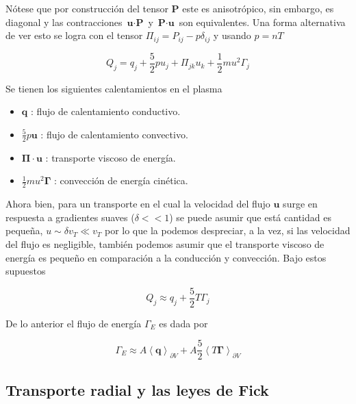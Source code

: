 \documentclass[11pt]{article}
\theoremstyle{definition}
\begin{document}
  N\'otese que por construcci\'on del tensor $\textbf{P}$ este es anisotr\'opico, sin embargo, es diagonal y las contracciones $\textbf{u}\cdot\textbf{P}$ y $\textbf{P}\cdot\textbf{u}$ son equivalentes. Una forma alternativa de ver esto se logra con el tensor $\Pi_{ij} = P_{ij} - p\delta_{ij}$ y usando $p = nT$ 

  \begin{equation}
    Q_j = q_j + \frac{5}{2}pu_j + \Pi_{jk}u_k + \frac{1}{2}mu^2\Gamma_j
  \end{equation}

  Se tienen los siguientes calentamientos en el plasma\cite{helander2005}

  \begin{itemize}
    \item $\textbf{q}$ : flujo de calentamiento conductivo.
    \item $\frac{5}{2}p\textbf{u}$ : flujo de calentamiento convectivo.
    \item $\pmb{\Pi}\cdot\textbf{u}$ : transporte viscoso de energ\'ia.
    \item $\frac{1}{2}mu^2\pmb{\Gamma}$ : convecci\'on de energ\'ia cin\'etica.
  \end{itemize}

Ahora bien, para un transporte en el cual la velocidad del flujo $\textbf{u}$ surge en respuesta a gradientes suaves ($\delta << 1$) se puede asumir que est\'a cantidad es pequeña, $u \sim \delta v_T \ll v_T$ por lo que la podemos despreciar, a la vez, si las velocidad del flujo es negligible, tambi\'en podemos asumir que el transporte viscoso de energ\'ia es pequeño en comparaci\'on a la conducci\'on y convecci\'on. Bajo estos supuestos\cite{dinklage2005}

  \begin{equation*}
    Q_j \approx q_j + \frac{5}{2}T\Gamma_j
  \end{equation*}

  De lo anterior el flujo de energ\'ia $\Gamma_E$ es dada por 

  \begin{equation}\label{eq:heatfluxp}
    \Gamma_E \approx A\left<\textbf{q}\right>_{\partial V} + A\frac{5}{2}\left<T\pmb{\Gamma}\right>_{\partial V}
  \end{equation}

  \subsection{Transporte radial y las leyes de Fick}
\end{document}
